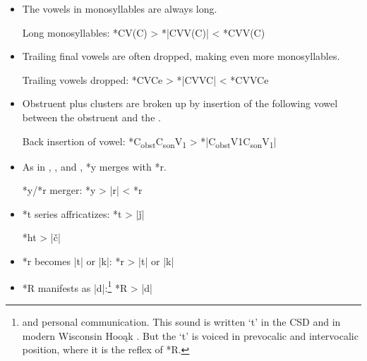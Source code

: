 \documentclass[output=paper]{LSP/langsci}
\begin{document}
\begin{itemize}
\item The vowels in monosyllables are always long.


Long monosyllables: \hspace{1em} *CV(C)    >	*|CVV(C)|     <	*CVV(C)
\item Trailing final vowels are often dropped, making even more monosyllables.


Trailing vowels dropped: \hspace{1em} 	*CVCe    >	*|CVVC|        <	*CVVCe
\item Obstruent plus  clusters are broken up by insertion of the following vowel between the obstruent and the .


Back insertion of vowel:	 \hspace{1em}  *C\textsubscript{obst}C\textsubscript{son}V\textsubscript{1}    >	*|C\textsubscript{obst}V1C\textsubscript{son}V\textsubscript{1}|
\item As in , , and ,  *y merges with *r.


*y/*r merger: \hspace{1em} *y	>	|r|	<	*r
\item *t series affricatizes: \hspace{1em} *t  >  |\v{j}|  

\hspace{9.2em} *ht	 >  |\v{c}|  

\item *r\textsuperscript{} becomes |t\textsuperscript{}| or |k\textsuperscript{}|: \hspace{1em} *r\textsuperscript{}	>	|t\textsuperscript{}| or |k\textsuperscript{}|
\item *R manifests as |d|:\footnote{\citet{HelmbrechtND} and personal communication. This sound is written `t' in the CSD and in modern Wisconsin Hoo\k{a}k . But the `t' is voiced in prevocalic and intervocalic position, where it is the reflex of *R.} \hspace{2em} *R	>	|d|
\end{itemize}
\end{document}
